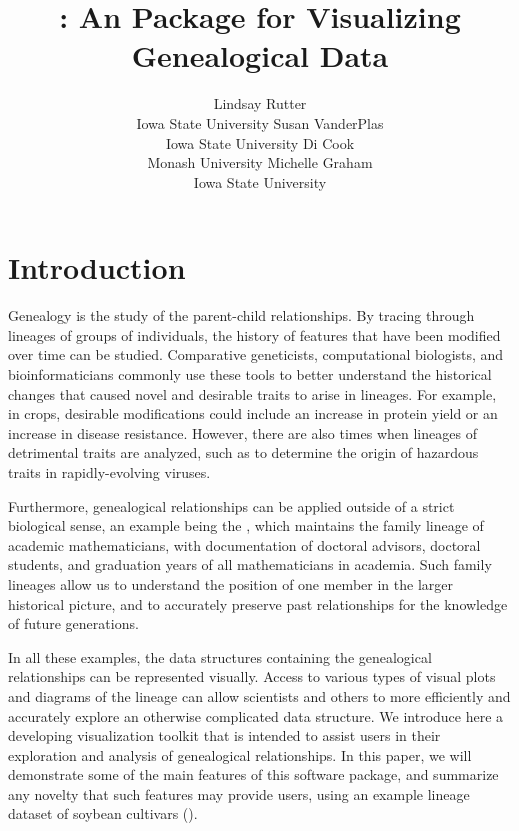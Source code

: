 \documentclass[article,shortnames]{jss}
\author{Lindsay Rutter\\Iowa State University \And 
        Susan VanderPlas\\Iowa State University \And
        Di Cook\\Monash University\And
        Michelle Graham\\Iowa State University}
\title{\pkg{ggenealogy}: An \proglang{R} Package for Visualizing Genealogical Data}
\begin{document}


\section{Introduction}

Genealogy is the study of the parent-child relationships. By tracing through lineages of groups of individuals, the history of features that have been modified over time can be studied. Comparative geneticists, computational biologists, and bioinformaticians commonly use these tools to better understand the historical changes that caused novel and desirable traits to arise in lineages. For example, in crops, desirable modifications could include an increase in protein yield or an increase in disease resistance. However, there are also times when lineages of detrimental traits are analyzed, such as to determine the origin of hazardous traits in rapidly-evolving viruses.

Furthermore, genealogical relationships can be applied outside of a strict biological sense, an example being the \citealt{mgp}, which maintains the family lineage of academic mathematicians, with documentation of doctoral advisors, doctoral students, and graduation years of all mathematicians in academia. Such family lineages allow us to understand the position of one member in the larger historical picture, and to accurately preserve past relationships for the knowledge of future generations.

In all these examples, the data structures containing the genealogical relationships can be represented visually. Access to various types of visual plots and diagrams of the lineage can allow scientists and others to more efficiently and accurately explore an otherwise complicated data structure. We introduce here a developing visualization toolkit that is intended to assist users in their exploration and analysis of genealogical relationships. In this paper, we will demonstrate some of the main features of this software package, and summarize any novelty that such features may provide users, using an example lineage dataset of soybean cultivars (\citealt{soybean}).
\end{document}
